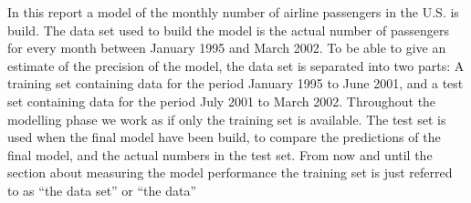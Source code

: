\def\assignmenttitle{Modelling and Predicting the Number of Airline Passengers}
\def\assignmentnumber{3}
\def\assignmentdate{29-10-2011}





\maketitle

In this report a model of the monthly number of airline passengers in the U.S. is build. The data set used to build the model is the actual number of passengers for every month between January 1995 and March 2002. To be able to give an estimate of the precision of the model, the data set is separated into two parts: A training set containing data for the period January 1995 to June 2001, and a test set containing data for the period July 2001 to March 2002. Throughout the modelling phase we work as if only the training set is available. The test set is used when the final model have been build, to compare the predictions of the final model, and the actual numbers in the test set. From now and until the section about measuring the model performance the training set is just referred to as ``the data set'' or ``the data''

